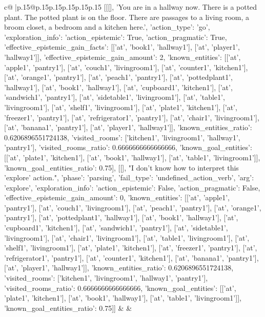\documentclass{article}
\begin{document}
{\begin{supertabular}{c@{$\;$}|p{.15\linewidth}@{}p{.15\linewidth}p{.15\linewidth}p{.15\linewidth}p{.15\linewidth}p{.15\linewidth}}
{{{	 [[[], 'You are in a hallway now. There is a potted plant. The potted plant is on the floor. There are passages to a living room, a broom closet, a bedroom and a kitchen here.', {'action_type': 'go', 'exploration_info': {'action_epistemic': True, 'action_pragmatic': True, 'effective_epistemic_gain_facts': [['at', 'book1', 'hallway1'], ['at', 'player1', 'hallway1']], 'effective_epistemic_gain_amount': 2, 'known_entities': [['at', 'apple1', 'pantry1'], ['at', 'couch1', 'livingroom1'], ['at', 'counter1', 'kitchen1'], ['at', 'orange1', 'pantry1'], ['at', 'peach1', 'pantry1'], ['at', 'pottedplant1', 'hallway1'], ['at', 'book1', 'hallway1'], ['at', 'cupboard1', 'kitchen1'], ['at', 'sandwich1', 'pantry1'], ['at', 'sidetable1', 'livingroom1'], ['at', 'table1', 'livingroom1'], ['at', 'shelf1', 'livingroom1'], ['at', 'plate1', 'kitchen1'], ['at', 'freezer1', 'pantry1'], ['at', 'refrigerator1', 'pantry1'], ['at', 'chair1', 'livingroom1'], ['at', 'banana1', 'pantry1'], ['at', 'player1', 'hallway1']], 'known_entities_ratio': 0.6206896551724138, 'visited_rooms': ['kitchen1', 'livingroom1', 'hallway1', 'pantry1'], 'visited_rooms_ratio': 0.6666666666666666, 'known_goal_entities': [['at', 'plate1', 'kitchen1'], ['at', 'book1', 'hallway1'], ['at', 'table1', 'livingroom1']], 'known_goal_entities_ratio': 0.75}}], [[], "I don't know how to interpret this 'explore' action.", {'phase': 'parsing', 'fail_type': 'undefined_action_verb', 'arg': 'explore', 'exploration_info': {'action_epistemic': False, 'action_pragmatic': False, 'effective_epistemic_gain_amount': 0, 'known_entities': [['at', 'apple1', 'pantry1'], ['at', 'couch1', 'livingroom1'], ['at', 'peach1', 'pantry1'], ['at', 'orange1', 'pantry1'], ['at', 'pottedplant1', 'hallway1'], ['at', 'book1', 'hallway1'], ['at', 'cupboard1', 'kitchen1'], ['at', 'sandwich1', 'pantry1'], ['at', 'sidetable1', 'livingroom1'], ['at', 'chair1', 'livingroom1'], ['at', 'table1', 'livingroom1'], ['at', 'shelf1', 'livingroom1'], ['at', 'plate1', 'kitchen1'], ['at', 'freezer1', 'pantry1'], ['at', 'refrigerator1', 'pantry1'], ['at', 'counter1', 'kitchen1'], ['at', 'banana1', 'pantry1'], ['at', 'player1', 'hallway1']], 'known_entities_ratio': 0.6206896551724138, 'visited_rooms': ['kitchen1', 'livingroom1', 'hallway1', 'pantry1'], 'visited_rooms_ratio': 0.6666666666666666, 'known_goal_entities': [['at', 'plate1', 'kitchen1'], ['at', 'book1', 'hallway1'], ['at', 'table1', 'livingroom1']], 'known_goal_entities_ratio': 0.75}}]] 
	  } 
	   } 
	   } 
	 & & \\ 
 

    \theutterance {}  


\end{supertabular}}
\end{document}
